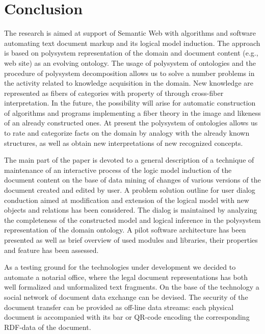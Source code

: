 \documentclass[conference]{IEEEtran}
\begin{document}
\section{Conclusion}

The research is aimed at support of Semantic Web with algorithms and software automating text document markup and its logical model induction.  The approach is based on polysystem representation of the domain and document content (e.g., web site) as an evolving ontology.  The usage of polysystem of ontologies and the procedure of polysystem decomposition \cite{father} allows us to solve a number problems in the activity related to knowledge acquisition in the domain.  New knowledge are represented as fibers of categories with property of through cross-fiber interpretation.  In the future, the possibility will arise for automatic construction of algorithms and programs implementing a fiber theory in the image and likeness of an already constructed ones.  At present the polysystem of ontologies allows us to rate and categorize facts on the domain by analogy with the already known structures, as well as obtain new interpretations of new recognized concepts.

The main part of the paper is devoted to a general description of a technique of maintenance of an interactive process of the logic model induction of the document content on the base of data mining of changes of various versions of the document created and edited by user.  A problem solution outline for user dialog conduction aimed at modification and extension of the logical model with new objects and relations has been considered.  The dialog is maintained by analyzing the completeness of the constructed model and logical inference in the polysystem representation of the domain ontology. A pilot software architecture has been presented as well as brief overview of used modules and libraries, their properties and feature has been assessed.

As a testing ground for the technologies under development we decided to automate a notarial office, where the legal document representations has both well formalized and unformalized text fragments.  On the base of the technology a social network of document data exchange can be devised. The security of the document transfer can be provided as off-line data streams: each physical document is accompanied with its bar or QR-code encoding the corresponding RDF-data of the document.

\end{document}
